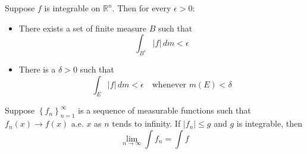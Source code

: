 \documentclass{ctexbook}
\begin{document}
\begin{thm}
    Suppose $f$ is integrable on $\mathbb{R}^n$. Then for every $\epsilon > 0$:
    \begin{itemize}
        \item There exists a set of finite measure $B$ such that \[\int_{B^c} \left\lvert f\right\rvert \, dm < \epsilon\]
        \item There is a $\delta > 0$ such that \[\int_E \left\lvert f\right\rvert\,dm < \epsilon\quad\text{whenever }m(E) < \delta \]
    \end{itemize}
\end{thm}

\begin{thm}
    Suppose $\left\{f_n\right\}_{n=1}^\infty$ is a sequence of measurable functions such that $f_n(x)\rightarrow f(x)\text{ a.e. }x$
    as $n$ tends to infinity. If $\left\lvert f_n\right\rvert \leq g $ and $g$ is integrable, then
    \[\lim_{n\rightarrow\infty}\int f_n = \int f\]
\end{thm}
\end{document}
